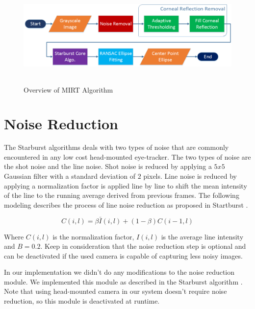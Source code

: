 \begin{figure}[h]
\begin{dBox}
\centering
	\mbox{
		\includegraphics[width=\textwidth]{./Pictures/starburst/Starburst_overview.png}
	}
   \caption{Overview of MIRT Algorithm \label{fig:starburst_overview} }   
\end{dBox}   
\end{figure}


\section{Noise Reduction}
The Starburst algorithms deals with two types of noise that are commonly encountered in any low cost head-mounted eye-tracker. The two types of noise are the shot noise and the line noise. Shot noise is reduced by applying a $5x5$ Gaussian filter with a standard deviation of $2$ pixels. Line noise is reduced by applying a normalization factor is applied line by line to shift the mean intensity of the line to the running average derived from previous frames. The following modeling describes the process of line noise reduction as proposed in Startburst \cite{starburst}.

\begin{dBox}
\centering
	\begin{equation}
	C(i,l) = \beta \bar I  (i,l) + (1 - \beta) C(i-1, l)
	\end{equation}
\end{dBox}

Where $C(i,l)$ is the normalization factor, $I(i,l)$ is the average line intensity and $B = 0.2$. Keep in consideration that the noise reduction step is optional and can be deactivated if the used camera is capable of capturing less noisy images. \bigskip

\begin{our}
In our implementation we didn't do any modifications to the noise reduction module. We implemented this module as described in the Starburst algorithm \cite{starburst}. Note that using head-mounted camera in our system doesn't require noise reduction, so this module is deactivated at runtime.
\end{our}


